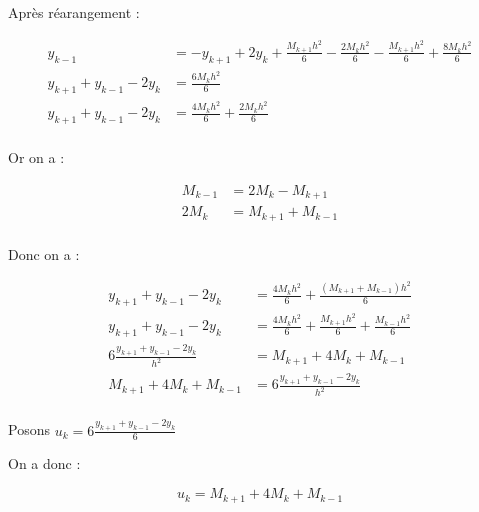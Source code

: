 \documentclass{article}
\begin{document}
\begin{enumerate}
\begin{enumerate}
    Après réarangement :

    \begin{equation*}
      \begin{split}
        y_{k - 1} & = - y_{k + 1} + 2 y_k + \frac{M_{k
            + 1} h^2}{6} - \frac{2 M_k h^2}{6} - \frac{M_{k + 1}
          h^2}{6} + \frac{8 M_k h^2}{6} \\
        y_{k + 1} + y_{k - 1} - 2 y_k & = \frac{6 M_k h^2}{6} \\
        y_{k + 1} + y_{k - 1} - 2 y_k & = \frac{4 M_k h^2}{6} + \frac{2 M_k h^2}{6}\\
      \end{split}
    \end{equation*}

    Or on a :

    \begin{equation*}
      \begin{split}
        M_{k - 1} & = 2 M_k - M_{k + 1} \\
        2 M_k & =M_{k + 1} + M_{k - 1} \\
      \end{split}
    \end{equation*}
  \end{enumerate}

  Donc on a :

    \begin{equation*}
      \begin{split}
        y_{k + 1} + y_{k - 1} - 2 y_k & = \frac{4 M_k h^2}{6} +
        \frac{(M_{k + 1} + M_{k - 1}) h^2}{6}\\
        y_{k + 1} + y_{k - 1} - 2 y_k & = \frac{4 M_k h^2}{6} +
        \frac{M_{k + 1} h^2}{6} + \frac{M_{k - 1} h^2}{6}\\
        6 \frac{y_{k + 1} + y_{k - 1} - 2 y_k}{h^2} & = M_{k + 1} + 4
        M_k + M_{k - 1} \\
        M_{k + 1} + 4  M_k + M_{k - 1} & = 6 \frac{y_{k + 1} + y_{k - 1} - 2 y_k}{h^2} \\
      \end{split}
    \end{equation*}

    Posons $u_k = 6 \frac{y_{k + 1} + y_{k - 1} - 2
      y_k}{6}$ \newline \newline

    On a donc :

    \begin{equation*}
      u_k = M_{k + 1} + 4  M_k + M_{k - 1}
    \end{equation*}


\end{enumerate}
\end{document}
